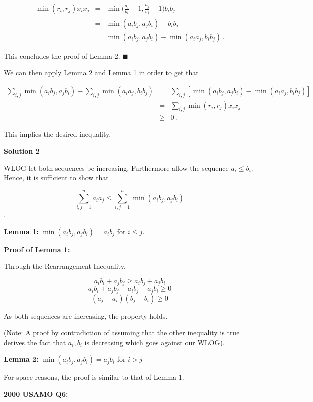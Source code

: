 \begin{enumerate}
 
 \begin{eqnarray*}\min(r_{i}, r_{j}) x_{i}x_{j}& = &\min\bigl(\frac{a_{i}}{b_{i}}-1,\frac{a_{j}}{b_{j}}-1\bigr) b_{i}b_{j}\\ & = &\min(a_{i}b_{j}, a_{j}b_{i})-b_{i}b_{j}\\ & = &\min(a_{i}b_{j}, a_{j}b_{i})-\min(a_{i}a_{j}, b_{i}b_{j})\, .\end{eqnarray*}

 This concludes the proof of Lemma 2. $\blacksquare$

 We can then apply Lemma 2 and Lemma 1 in order to get that

 
 \begin{eqnarray*}\sum_{i,j}\min(a_{i}b_{j}, a_{j}b_{i})-\sum_{i, j}\min(a_{i}a_{j}, b_{i}b_{j}) & = &\sum_{i, j}\left[\min(a_{i}b_{j}, a_{j}b_{i})-\min(a_{i}a_{j}, b_{i}b_{j})\right]\\ & = &\sum_{i, j}\min(r_{i}, r_{j}) x_{i}x_{j}\\ &\ge & 0\, .\end{eqnarray*}

 This implies the desired inequality.

 



\textbf{Solution 2}

WLOG let both sequences be increasing. Furthermore allow the sequence $a_i \leq b_i$. Hence, it is sufficient to show that

 
 \[\sum_{i,j = 1}^n a_ia_j \leq \sum_{i,j = 1}^n \min(a_ib_j, a_jb_i)\]. 

 \textbf{Lemma 1:} $\min(a_ib_j, a_jb_i) =  a_ib_j$ for $i \leq j$.

 \textbf{Proof of Lemma 1:}

 Through the Rearrangement Inequality,

 
 \[a_i b_i+a_j b_j\ge a_i b_j+a_j b_i\]
 \[a_i b_i+a_j b_j-a_i b_j-a_j b_i\ge0\]
 \[(a_j-a_i)(b_j-b_i)\ge0\]

 As both sequences are increasing, the property holds.

 (Note: A proof by contradiction of assuming that the other inequality is true derives the fact that $a_i, b_i$ is decreasing which goes against our WLOG).

 \textbf{Lemma 2:} $\min(a_ib_j, a_jb_i) =  a_jb_i$  for $i > j$

 For space reasons, the proof is similar to that of Lemma 1. 

 \textbf{2000 USAMO Q6:}


\end{enumerate}
